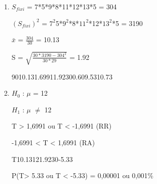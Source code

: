 
\begin{question}
    
    \begin{enumerate}[label={\textbf{\alph*)}}]

        \item
   
            $S_{fixi}$ = 7*5*9*8*11*12*13*5 = 304

            $(S_{fixi})^2$ = $7^2$5*$9^2$*8*$11^2$*12*$13^2$*5 = 3190

            $\bar{x}$ = $\frac{304}{30}$ = 10.13 

            S = $\sqrt{\frac{30*3190-304^2}{30*29}}$ = 1.92

            \begin{formula2}
                {90}{10.13}{1.6991}{1.92}{30}{0.60}{9.53}{10.73}
            \end{formula2}

        \item 

            $H_0$ : $\mu$ = 12

            $H_1$ : $\mu$ $\neq$ 12 
        
            T > 1,6991 ou T < -1,6991 (RR)

            -1,6991 < T < 1,6991 (RA)

            \begin{formula7}
                {T}{10.13}{12}{1.92}{30}{-5.33}
            \end{formula7}

            P(T> 5.33 ou T < -5.33) = 0,00001 ou 0,001\%

    \end{enumerate}
\end{question}